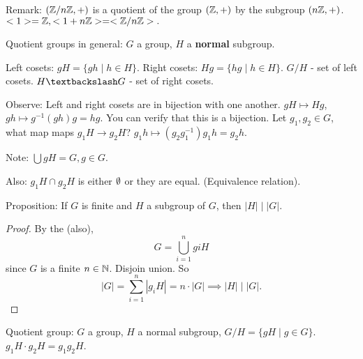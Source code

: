 Remark: $\left( \mathbb{Z}/n\mathbb{Z},+ \right) $ is a quotient of the group $\left( \mathbb{Z},+ \right)$ by the subgroup $\left( n\mathbb{Z},+ \right) $. $<1>=\mathbb{Z}, <1+n\mathbb{Z}> = <\mathbb{Z}/n\mathbb{Z}>.$

Quotient groups in general: $G$ a group, $H$ a \textbf{normal} subgroup. 

\begin{definition}[Cosets]
    Left cosets: $gH=\{ gh \mid h \in H \}.$
    Right cosets: $Hg=\{ hg \mid h \in H \}.$
    $G/H$ - set of left cosets.
    $H\textbackslash G$ - set of right cosets.
\end{definition}
Observe: Left and right cosets are in bijection with one another. $gH \mapsto Hg$, $gh \mapsto g^{-1}(gh)g=hg$. You can verify that this is a bijection. Let $g_1,g_2 \in G$, what map maps $g_1H \to g_2H$? $g_1h \mapsto (g_2g_1^{-1})g_1h=g_2h.$

Note: $\bigcup gH = G, g \in G$.

Also: $g_1H \cap g_2H $ is either $\emptyset$ or they are equal. (Equivalence relation).

Proposition: If $G$ is finite and $H$ a subgroup of $G$, then $|H| \mid |G|$.

\begin{proof}
    By the (also), \[
    G = \bigcup_{i=1}^{n}giH
    \]
    since $G$ is a finite $n \in \mathbb{N}$. Disjoin union. So \[
        |G|= \sum_{i=1}^{n} |g_iH| = n \cdot |G| \implies |H| \mid |G|.
    \]
\end{proof}

Quotient group: $G$ a group, $H$ a normal subgroup, $G/H = \{ gH \mid g \in G \}$. $g_1H \cdot g_2H = g_1g_2H$.

